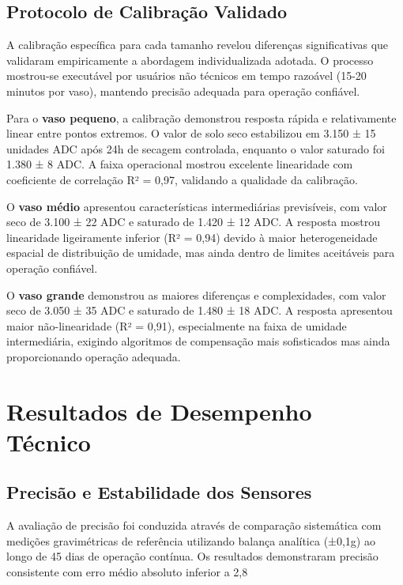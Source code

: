 \subsection{Protocolo de Calibração Validado}

A calibração específica para cada tamanho revelou diferenças significativas que validaram empiricamente a abordagem individualizada adotada. O processo mostrou-se executável por usuários não técnicos em tempo razoável (15-20 minutos por vaso), mantendo precisão adequada para operação confiável.

Para o \textbf{vaso pequeno}, a calibração demonstrou resposta rápida e relativamente linear entre pontos extremos. O valor de solo seco estabilizou em 3.150 ± 15 unidades ADC após 24h de secagem controlada, enquanto o valor saturado foi 1.380 ± 8 ADC. A faixa operacional mostrou excelente linearidade com coeficiente de correlação R² = 0,97, validando a qualidade da calibração.

O \textbf{vaso médio} apresentou características intermediárias previsíveis, com valor seco de 3.100 ± 22 ADC e saturado de 1.420 ± 12 ADC. A resposta mostrou linearidade ligeiramente inferior (R² = 0,94) devido à maior heterogeneidade espacial de distribuição de umidade, mas ainda dentro de limites aceitáveis para operação confiável.

O \textbf{vaso grande} demonstrou as maiores diferenças e complexidades, com valor seco de 3.050 ± 35 ADC e saturado de 1.480 ± 18 ADC. A resposta apresentou maior não-linearidade (R² = 0,91), especialmente na faixa de umidade intermediária, exigindo algoritmos de compensação mais sofisticados mas ainda proporcionando operação adequada.


\section{Resultados de Desempenho Técnico}

\subsection{Precisão e Estabilidade dos Sensores}

A avaliação de precisão foi conduzida através de comparação sistemática com medições gravimétricas de referência utilizando balança analítica (±0,1g) ao longo de 45 dias de operação contínua. Os resultados demonstraram precisão consistente com erro médio absoluto inferior a 2,8%

